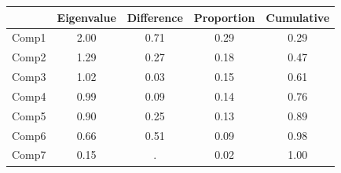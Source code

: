 {
\def\sym#1{\ifmmode^{#1}\else\(^{#1}\)\fi}
\begin{tabular}{l*{1}{cccc}}
\toprule
            &  Eigenvalue&  Difference&  Proportion&  Cumulative\\
\midrule
Comp1       &        2.00&        0.71&        0.29&        0.29\\
Comp2       &        1.29&        0.27&        0.18&        0.47\\
Comp3       &        1.02&        0.03&        0.15&        0.61\\
Comp4       &        0.99&        0.09&        0.14&        0.76\\
Comp5       &        0.90&        0.25&        0.13&        0.89\\
Comp6       &        0.66&        0.51&        0.09&        0.98\\
Comp7       &        0.15&           .&        0.02&        1.00\\
\bottomrule
\end{tabular}
}
